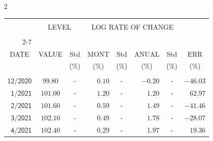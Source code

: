 \begin{multicols}{2}{ 
\begin{tabular}{rccrcrcr} 
\hline 
 \multicolumn{1}{|c|}{}  &  \multicolumn{2}{c|}{} & 
\multicolumn{4}{c}{} & \multicolumn{1}{|c|}{}\vspace{-.10in}\\ 
\multicolumn{1}{|c|}{}  &  \multicolumn{2}{c|}{LEVEL} & 
\multicolumn{4}{c}{LOG RATE OF CHANGE} & \multicolumn{1}{|c|}{}    \\  
\multicolumn{1}{|c|}{}  &  \multicolumn{2}{c|}{} & 
\multicolumn{4}{c}{} & \multicolumn{1}{|c|}{}\vspace{-.10in}\\ \cline{2-7} 
\multicolumn{1}{|c|}{ } &\multicolumn{1}{c|}{ } & \multicolumn{1}{c|}{} & \multicolumn{1}{c|}{} & \multicolumn{1}{c|}{}     & \multicolumn{1}{c|}{} & \multicolumn{1}{c|}{}  & \multicolumn{1}{c|}{}  \vspace{-.05in}\\  
\multicolumn{1}{|c|}{DATE } &\multicolumn{1}{c|}{ VALUE} & \multicolumn{1}{c|}{Std} & \multicolumn{1}{c|}{MONT} & \multicolumn{1}{c|}{Std}     & \multicolumn{1}{c|}{ANUAL} & \multicolumn{1}{c|}{Std}  & \multicolumn{1}{c|}{ERR}\\  
\multicolumn{1}{|c|}{ }      & \multicolumn{1}{c|}{  }    & \multicolumn{1}{c|}{($\%$)}&  \multicolumn{1}{c|}{($\%$)  }  & \multicolumn{1}{c|}{($\%$)} & \multicolumn{1}{c|}{($\%$) }     & \multicolumn{1}{c|}{ ($\%$) }  &  \multicolumn{1}{c|}{ ($\%$) } \\  
 \hline 
 \\$\mathsf{      12/2020}$ &$\mathsf{    99.80}$ &     - &$\mathsf{    0.10}$ &     - &$\mathsf{    -0.20 }$ &     - &$\mathsf{ -46.03} $ \vspace{-.005in}\\ 
$\mathsf{       1/2021}$ &$\mathsf{   101.00}$ &     - &$\mathsf{    1.20}$ &     - &$\mathsf{     1.20 }$ &     - &$\mathsf{  62.97} $ \vspace{-.005in}\\ 
$\mathsf{       2/2021}$ &$\mathsf{   101.60}$ &     - &$\mathsf{    0.59}$ &     - &$\mathsf{     1.49 }$ &     - &$\mathsf{ -41.46} $ \vspace{-.005in}\\ 
$\mathsf{       3/2021}$ &$\mathsf{   102.10}$ &     - &$\mathsf{    0.49}$ &     - &$\mathsf{     1.78 }$ &     - &$\mathsf{ -28.07} $ \vspace{-.005in}\\ 
$\mathsf{       4/2021}$ &$\mathsf{   102.40}$ &     - &$\mathsf{    0.29}$ &     - &$\mathsf{     1.97 }$ &     - &$\mathsf{  19.36} $ \vspace{-.005in}\\ 

\end{tabular}}
\end{multicols}
